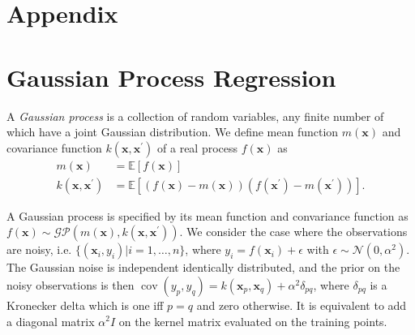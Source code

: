 \section*{Appendix}

\section{Gaussian Process Regression}

A \textit{Gaussian process} is a collection of random variables, any finite number of which have a joint Gaussian distribution. 
We define mean function $m(\mathbf{x})$  and covariance function $k(\mathbf{x}, \mathbf{x}^\prime)$ of a real process $f(\mathbf{x})$ as
\begin{align}
    m(\mathbf{x}) &= \mathbb{E}[f(\mathbf{x})]\\
    k(\mathbf{x}, \mathbf{x}^\prime) &= \mathbb{E}[(f(\mathbf{x}) - m(\mathbf{x}))(f(\mathbf{x}^\prime) - m(\mathbf{x}^\prime))].
\end{align}

A Gaussian process is specified by its mean function and convariance function as $f(\mathbf{x}) \sim \mathcal{G} \mathcal{P}\left(m(\mathbf{x}), k\left(\mathbf{x}, \mathbf{x}^{\prime}\right)\right)$.
We consider the case where the observations are noisy, i.e. $\{(\mathbf{x}_i, y_i)| i = 1, \dots, n\}$, where $y_i = f(\mathbf{x}_i) + \epsilon$ with $\epsilon \sim \mathcal{N}(0, \alpha^2)$. 
The Gaussian noise is independent identically distributed, and the prior on the noisy observations is then $\operatorname{cov}\left(y_{p}, y_{q}\right)=k\left(\mathbf{x}_{p}, \mathbf{x}_{q}\right)+\alpha^{2} \delta_{p q}$,
where $\delta_{pq}$ is a Kronecker delta which is one iff $p = q$ and zero otherwise.
It is equivalent to add a diagonal matrix $\alpha^2 I$ on the kernel matrix evaluated on the training points.

